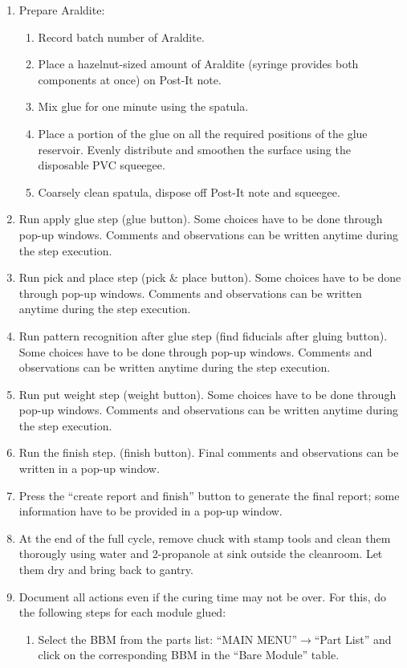 \documentclass[12pt]{unlsilabsop}
\begin{document}
\begin{enumerate}
    \item Prepare Araldite:
    \begin{enumerate}
        \item Record batch number of Araldite.
        \item Place a hazelnut-sized amount of Araldite (syringe provides both components at once) on Post-It note.
        \item Mix glue for one minute using the spatula.
        \item Place a portion of the glue on all the required positions of the glue reservoir. Evenly distribute and smoothen the surface using the disposable PVC squeegee.
        \item Coarsely clean spatula, dispose off Post-It note and squeegee.
    \end{enumerate}
    \item Run apply glue step (glue button). Some choices have to be done through pop-up windows. Comments and observations can be written anytime during the step execution.
    \item Run pick and place step (pick \& place button). Some choices have to be done through pop-up windows. Comments and observations can be written anytime during the step execution.
    \item Run pattern recognition after glue step (find fiducials after gluing button). Some choices have to be done through pop-up windows. Comments and observations can be written anytime during the step execution.
    \item Run put weight step (weight button). Some choices have to be done through pop-up windows. Comments and observations can be written anytime during the step execution.
    \item Run the finish step. (finish button). Final comments and observations can be written in a pop-up window.
    \item Press the ``create report and finish'' button to generate the final report; some information have to be provided in a pop-up window.
    \item At the end of the full cycle, remove chuck with stamp tools and clean them thorougly using water and 2-propanole at sink outside the cleanroom. Let them dry and bring back to gantry.
    \item Document all actions even if the curing time may not be over. For this, do the following steps for each module glued:
    \begin{enumerate}
        \item Select the BBM from the parts list: ``MAIN MENU''$\rightarrow$``Part List'' and click on the corresponding BBM in the ``Bare Module'' table.

\end{enumerate}
\end{enumerate}
\end{document}
